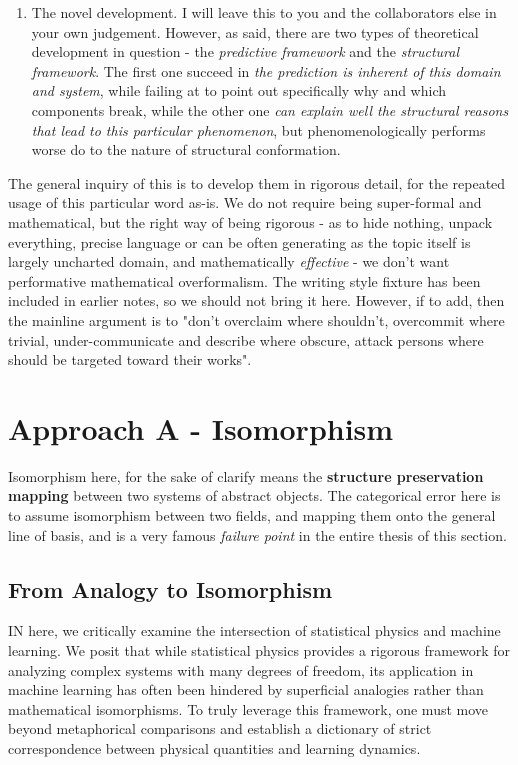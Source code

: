 \begin{enumerate}[topsep=1pt,itemsep=1pt]
    \item The novel development. I will leave this to you and the collaborators else in your own judgement. However, as said, there are two types of theoretical development in question - the \textit{predictive framework} and the \textit{structural framework}. The first one succeed in \textit{the prediction is inherent of this domain and system}, while failing at to point out specifically why and which components break, while the other one \textit{can explain well the structural reasons that lead to this particular phenomenon}, but phenomenologically performs worse do to the nature of structural conformation.
\end{enumerate}

The general inquiry of this is to develop them in rigorous detail, for the repeated usage of this particular word as-is. We do not require being super-formal and mathematical, but the right way of being rigorous - as to hide nothing, unpack everything, precise language or can be often generating as the topic itself is largely uncharted domain, and mathematically \textit{effective} - we don't want performative mathematical overformalism. The writing style fixture has been included in earlier notes, so we should not bring it here. However, if to add, then the mainline argument is to "don't overclaim where shouldn't, overcommit where trivial, under-communicate and describe where obscure, attack persons where should be targeted toward their works". 

\section{Approach A - Isomorphism}

Isomorphism here, for the sake of clarify means the \textbf{structure preservation mapping} between two systems of abstract objects. The categorical error here is to assume isomorphism between two fields, and mapping them onto the general line of basis, and is a very famous \textit{failure point} in the entire thesis of this section. 

\subsection{From Analogy to Isomorphism}

IN here, we critically examine the intersection of statistical physics and machine learning. We posit that while statistical physics provides a rigorous framework for analyzing complex systems with many degrees of freedom, its application in machine learning has often been hindered by superficial analogies rather than mathematical isomorphisms. To truly leverage this framework, one must move beyond metaphorical comparisons and establish a dictionary of strict correspondence between physical quantities and learning dynamics.

